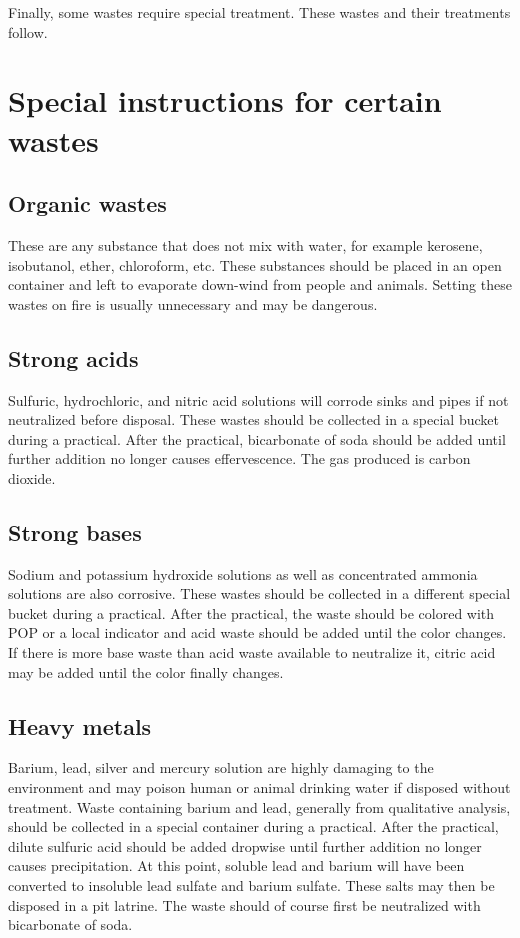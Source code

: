 Finally, some wastes require special treatment. 
These wastes and their treatments follow.

\section{Special instructions for certain wastes}
\subsection{Organic wastes}
These are any substance that does not mix with water, 
for example kerosene, isobutanol, ether, chloroform, etc. 
These substances should be placed in an open container 
and left to evaporate down-wind from people and animals. 
Setting these wastes on fire is usually unnecessary and may be dangerous.

\subsection{Strong acids}
Sulfuric, hydrochloric, and nitric acid solutions 
will corrode sinks and pipes if not neutralized before disposal. 
These wastes should be collected in a special bucket during a practical. 
After the practical, bicarbonate of soda should be added 
until further addition no longer causes effervescence. 
The gas produced is carbon dioxide.

\subsection{Strong bases}
Sodium and potassium hydroxide solutions 
as well as concentrated ammonia solutions are also corrosive. 
These wastes should be collected 
in a different special bucket during a practical. 
After the practical, the waste should be colored with POP 
or a local indicator and acid waste should be added until the color changes. 
If there is more base waste than acid waste available to neutralize it, 
citric acid may be added until the color finally changes.

\subsection{Heavy metals}
Barium, lead, silver and mercury solution 
are highly damaging to the environment 
and may poison human or animal drinking water if disposed without treatment. 
Waste containing barium and lead, generally from qualitative analysis, 
should be collected in a special container during a practical. 
After the practical, dilute sulfuric acid should be added dropwise 
until further addition no longer causes precipitation. 
At this point, soluble lead and barium will have been converted 
to insoluble lead sulfate and barium sulfate. 
These salts may then be disposed in a pit latrine. 
The waste should of course first be neutralized with bicarbonate of soda.

